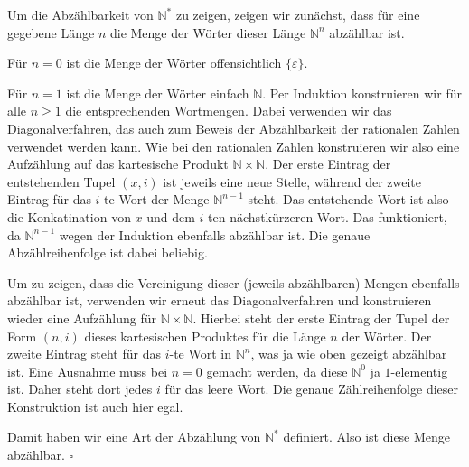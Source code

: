 Um die Abzählbarkeit von $\mathbb{N}^*$ zu zeigen, zeigen wir zunächst, dass für
eine gegebene Länge $n$ die Menge der Wörter dieser Länge $\mathbb{N}^n$
abzählbar ist.

Für $n=0$ ist die Menge der Wörter offensichtlich $\{\varepsilon\}$.

Für $n=1$ ist die Menge der Wörter einfach $\mathbb{N}$. Per Induktion
konstruieren wir für alle $n \ge 1$ die entsprechenden Wortmengen. Dabei
verwenden wir das Diagonalverfahren, das auch zum Beweis der Abzählbarkeit der
rationalen Zahlen verwendet werden kann. Wie bei den rationalen Zahlen
konstruieren wir also eine Aufzählung auf das kartesische Produkt
$\mathbb{N}\times\mathbb{N}$. Der erste Eintrag der entstehenden Tupel
$(x, i)$ ist jeweils eine neue Stelle, während der zweite Eintrag für das
$i$-te Wort der Menge $\mathbb{N}^{n-1}$ steht. Das entstehende Wort ist also
die Konkatination von $x$ und dem $i$-ten nächstkürzeren Wort. Das funktioniert,
da $\mathbb{N}^{n-1}$ wegen der Induktion ebenfalls abzählbar ist. Die genaue
Abzählreihenfolge ist dabei beliebig.

Um zu zeigen, dass die Vereinigung dieser (jeweils abzählbaren) Mengen ebenfalls
abzählbar ist, verwenden wir erneut das Diagonalverfahren und konstruieren
wieder eine Aufzählung für $\mathbb{N}\times\mathbb{N}$. Hierbei steht der erste
Eintrag der Tupel der Form $(n, i)$ dieses kartesischen Produktes für die 
Länge $n$ der Wörter. Der zweite Eintrag steht für das $i$-te Wort in
$\mathbb{N}^n$, was ja wie oben gezeigt abzählbar ist. Eine Ausnahme muss bei
$n = 0$ gemacht werden, da diese $\mathbb{N}^0$ ja $1$-elementig ist. Daher
steht dort jedes $i$ für das leere Wort. Die genaue Zählreihenfolge dieser
Konstruktion ist auch hier egal.

Damit haben wir eine Art der Abzählung von $\mathbb{N}^*$ definiert. Also ist
diese Menge abzählbar. \hfill$\square$
